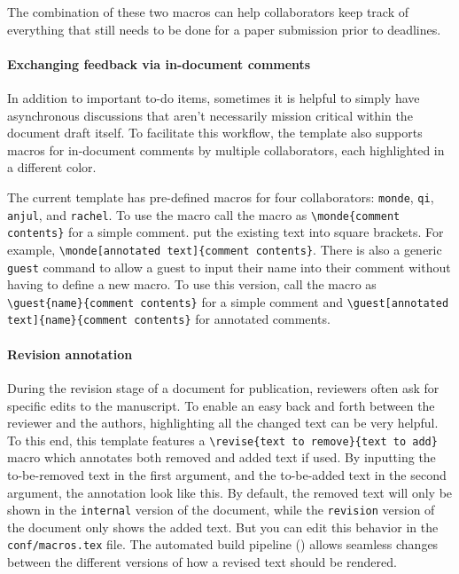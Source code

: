 The combination of these two macros can help collaborators keep track of everything that still needs to be done for a paper submission prior to deadlines.

\paragraph{Exchanging feedback via in-document comments}
In addition to important to-do items, sometimes it is helpful to simply have asynchronous discussions that aren't necessarily mission critical within the document draft itself.
To facilitate this workflow, the template also supports macros for in-document comments by multiple collaborators, each highlighted in a different color.

The current template has pre-defined macros for four collaborators: \texttt{monde}, \texttt{qi}, \texttt{anjul}, and \texttt{rachel}.
To use the macro call the macro as \texttt{\textbackslash monde\{comment contents\}} for a simple comment.
\break
put the existing text into square brackets.
For example, \texttt{\textbackslash monde[anno\hfill\break tated text]\{comment contents\}}.
There is also a generic \texttt{guest} command to allow a guest to input their name into their comment without having to define a new macro.
To use this version, call the macro as \texttt{\textbackslash guest\{name\}\{comment contents\}} for a simple comment and \texttt{\textbackslash guest[annotated text]\{name\}\{comment contents\}} for annotated comments.

\paragraph{Revision annotation}
During the revision stage of a document for publication, reviewers often ask for specific edits to the manuscript.
To enable an easy back and forth between the reviewer and the authors, highlighting all the changed text can be very helpful.
To this end, this template features a \texttt{\textbackslash revise\{text to remove\}\{text to add\}} macro which annotates both removed and added text if used.
By inputting the to-be-removed text in the first argument, and the to-be-added text in the second argument, the annotation  look like this.
By default, the removed text will only be shown in the \texttt{internal} version of the document, while the \texttt{revision} version of the document only shows the added text.
But you can edit this behavior in the \texttt{conf/macros.tex} file.
The automated build pipeline (\cf {}) allows seamless changes between the different versions of how a revised text should be rendered.

